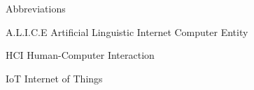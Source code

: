 \begin{dictionary}{Abbreviations}
\item[A.L.I.C.E]	Artificial Linguistic Internet Computer Entity
\item[HCI]			Human-Computer Interaction
\item[IoT]			Internet of Things

\end{dictionary}